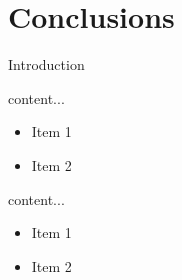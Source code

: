 \documentclass[10pt, aspectratio=169, handout]{aiaspres}
\begin{document}
	\section{Conclusions}
	\begin{frame}{Introduction}
		\begin{block}{content...}
			\begin{itemize}
				\item Item 1
				\item Item 2
			\end{itemize}
		\end{block}
		
		\begin{block}{content...}
			\begin{itemize}
				\item Item 1
				\item Item 2
			\end{itemize}
		\end{block}
	\end{frame}
\end{document}
